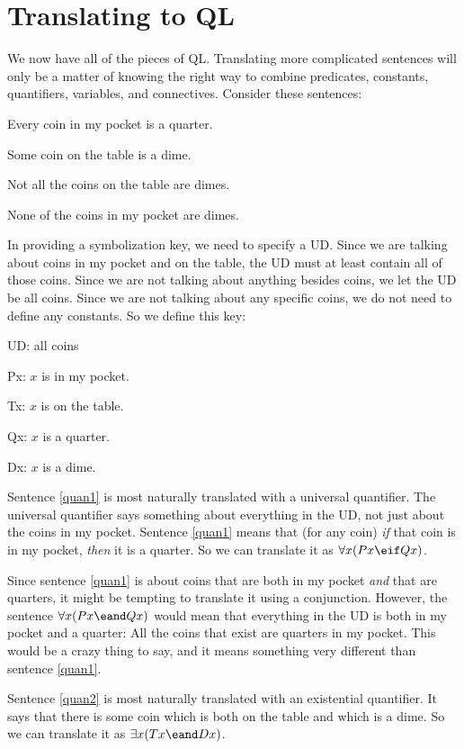 \section{Translating to QL}
We now have all of the pieces of QL. Translating more complicated sentences will only be a matter of knowing the right way to combine predicates, constants, quantifiers, variables, and connectives. Consider these sentences:
\begin{earg}
\item[\ex{quan1}] Every coin in my pocket is a quarter.
\item[\ex{quan2}] Some coin on the table is a dime.
\item[\ex{quan3}] Not all the coins on the table are dimes.
\item[\ex{quan4}] None of the coins in my pocket are dimes.
\end{earg}
In providing a symbolization key, we need to specify a UD. Since we are talking about coins in my pocket and on the table, the UD must at least contain all of those coins. Since we are not talking about anything besides coins, we let the UD be all coins. Since we are not talking about any specific coins, we do not need to define any constants. So we define this key:
\begin{ekey}
\item[UD:] all coins
\item[Px:] $x$ is in my pocket.
\item[Tx:] $x$ is on the table.
\item[Qx:] $x$ is a quarter.
\item[Dx:] $x$ is a dime.
\end{ekey}
Sentence \ref{quan1} is most naturally translated with a universal quantifier. The universal quantifier says something about everything in the UD, not just about the coins in my pocket. Sentence \ref{quan1} means that (for any coin) \emph{if} that coin is in my pocket, \emph{then} it is a quarter. So we can translate it as $\forall x(Px \eif Qx)$.

Since sentence \ref{quan1} is about coins that are both in my pocket \emph{and} that are quarters, it might be tempting to translate it using a conjunction. However, the sentence $\forall x(Px \eand Qx)$ would mean that everything in the UD is both in my pocket and a quarter: All the coins that exist are quarters in my pocket. This would be a crazy thing to say, and it means something very different than sentence \ref{quan1}.

Sentence \ref{quan2} is most naturally translated with an existential quantifier. It says that there is some coin which is both on the table and which is a dime. So we can translate it as $\exists x(Tx \eand Dx)$.


